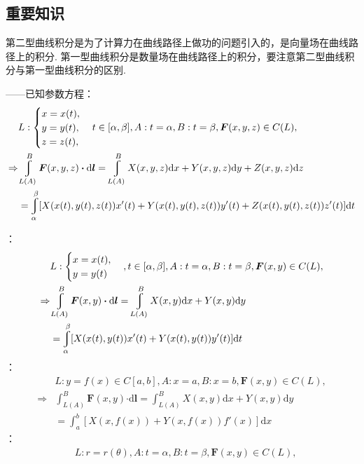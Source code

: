 \documentclass[12pt,UTF8]{ctexart}
\begin{document}
\subsection{重要知识}
第二型曲线积分是为了计算力在曲线路径上做功的问题引入的，是向量场在曲线路径上的积分. 第一型曲线积分是数量场在曲线路径上的积分，要注意第二型曲线积分与第一型曲线积分的区别.
\begin{enumerate}
\begin{enumerate}
——已知参数方程：\\
\[\begin{aligned}
&L:\begin{cases}x=x(t),\\ y=y(t),\\ z=z(t),\end{cases}t\in[\alpha,\beta], A: t=\alpha, B: t=\beta, \bm F(x,y,z)\in C(L),\\
\Rightarrow&\varint_{L(A)}^B\bm F(x,y,z)\bm\cdot\mathrm d\bm l=\varint_{L(A)}^BX(x,y,z)\mathrm dx+Y(x,y,z)\mathrm dy+Z(x,y,z)\mathrm dz\\
&=\varint_\alpha^\beta[X(x(t),y(t),z(t))x'(t)+Y(x(t),y(t),z(t))y'(t)+Z(x(t),y(t),z(t))z'(t)]\mathrm dt
\end{aligned}\]
\begin{enumerate}
：\\
\[\begin{aligned}
&L: \begin{cases}x=x(t),\\ y=y(t)\end{cases}, t\in[\alpha,\beta], A: t=\alpha, B: t=\beta, \bm F(x,y)\in C(L),\\
\Rightarrow&\varint_{L(A)}^B\bm F(x,y)\bm\cdot\mathrm d\bm l=\varint_{L(A)}^BX(x,y)\mathrm dx+Y(x,y)\mathrm dy\\
&=\varint_\alpha^\beta[X(x(t),y(t))x'(t)+Y(x(t),y(t))y'(t)]\mathrm dt
\end{aligned}\]
：
\[\begin{aligned}
&L: y=f(x)\in C[a,b], A: x=a, B: x=b, \bm F(x,y)\in C(L),\\
\Rightarrow&\int_{L(A)}^B\bm F(x,y)\bm\cdot\mathrm d\bm l=\int_{L(A)}^BX(x,y)\mathrm dx+Y(x,y)\mathrm dy\\
&=\int_a^b[X(x,f(x))+Y(x,f(x))f'(x)]\mathrm dx
\end{aligned}\]
：
\[\begin{aligned}
&L: r=r(\theta), A: t=\alpha, B: t=\beta, \bm F(x,y)\in C(L),\\

\end{aligned}\]
\end{enumerate}
\end{enumerate}
\end{enumerate}
\end{document}
